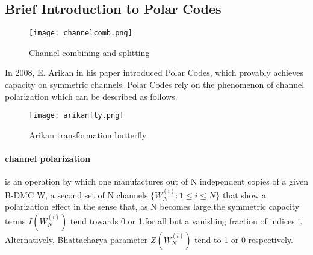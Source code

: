 \documentclass[
11pt, %
a4paper, %
oneside, %
headinclude,footinclude, %
BCOR5mm, %
]{scrartcl}
\begin{document}
\subsection{Brief Introduction to Polar Codes}
\begin{wrapfigure}{r}{0.5\textwidth}
  \begin{center}
    \texttt{[image: channelcomb.png]}
  \end{center}
  \caption{Channel combining and splitting}
  \label{fig:channelcomb}
\end{wrapfigure}
In 2008, E. Arikan in his paper \cite{arikan} introduced Polar Codes, which provably achieves capacity on symmetric channels. Polar Codes rely on the phenomenon of channel polarization which can be described as follows.
\begin{wrapfigure}{r}{0.5\textwidth}
  \begin{center}
    \texttt{[image: arikanfly.png]}
  \end{center}
  \caption{Arikan transformation butterfly}
  \label{fig:arikanfly}
\end{wrapfigure}
\paragraph{channel polarization}is an operation by which one manufactures out of N independent copies of a given B-DMC W, a second set of N channels $\{W^{(i)}_N : 1 \leq i \leq N \}$ that show a polarization effect in the sense that, as N becomes large,the symmetric capacity terms $I(W^{(i)}_N )$ tend towards 0 or 1,for all but a vanishing fraction of indices i. Alternatively, Bhattacharya parameter $Z(W^{(i)}_N)$ tend to 1 or 0 respectively. 
\end{document}
